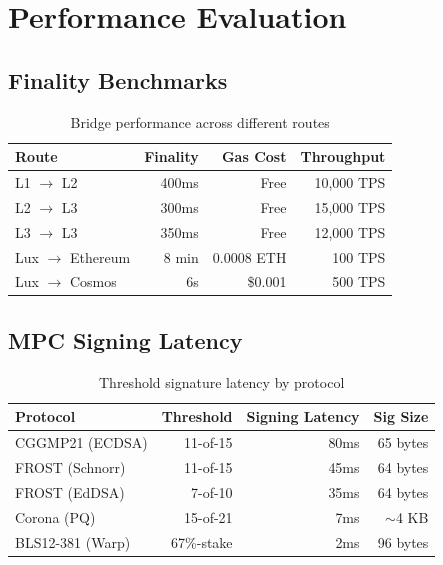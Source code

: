 \section{Performance Evaluation}


\subsection{Finality Benchmarks}

\begin{table}[h]
\centering
\begin{tabular}{lrrr}
\toprule
Route & Finality & Gas Cost & Throughput \\
\midrule
L1 $\to$ L2 & 400ms & Free & 10,000 TPS \\
L2 $\to$ L3 & 300ms & Free & 15,000 TPS \\
L3 $\to$ L3 & 350ms & Free & 12,000 TPS \\
Lux $\to$ Ethereum & 8 min & 0.0008 ETH & 100 TPS \\
Lux $\to$ Cosmos & 6s & \$0.001 & 500 TPS \\
\bottomrule
\end{tabular}
\caption{Bridge performance across different routes}
\end{table}

\subsection{MPC Signing Latency}

\begin{table}[h]
\centering
\begin{tabular}{lrrr}
\toprule
\textbf{Protocol} & \textbf{Threshold} & \textbf{Signing Latency} & \textbf{Sig Size} \\
\midrule
CGGMP21 (ECDSA) & 11-of-15 & 80ms & 65 bytes \\
FROST (Schnorr) & 11-of-15 & 45ms & 64 bytes \\
FROST (EdDSA) & 7-of-10 & 35ms & 64 bytes \\
Corona (PQ) & 15-of-21 & 7ms & $\sim$4 KB \\
BLS12-381 (Warp) & 67\%-stake & 2ms & 96 bytes \\
\bottomrule
\end{tabular}
\caption{Threshold signature latency by protocol}
\end{table}

